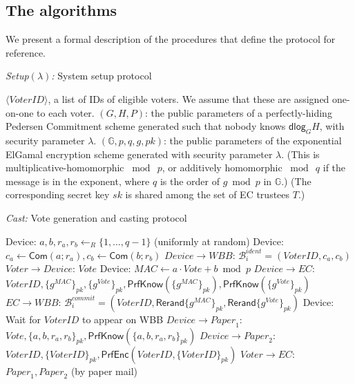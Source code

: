 \documentclass[12pt,a4paper]{article}
\newcommand{\commit}{\mathsf{Com}}
\newcommand{\PrfEnc}{\mathsf{PrfEnc}}
\newcommand{\PrfKnow}{\mathsf{PrfKnow}}
\newcommand{\rerand}{\mathsf{Rerand}}
\newcommand{\dlog}{\mathsf{dlog}}
\theoremstyle{definition}
\newcommand{\Vote}{\mathit{Vote}}
\newcommand{\VoterID}{\mathit{VoterID}}
\newcommand{\Paper}{\mathit{Paper}}
\newcommand{\Mac}{\mathit{MAC}}
\newcommand{\Wbb}{\mathit{WBB}}
\begin{document}
\subsection{The algorithms}
We present a formal description of the procedures that define the protocol for reference.
\singlespacing
\begin{algorithm}
    \caption{\textit{Setup}$(\lambda)$\textit{:} System setup protocol}
	\begin{algorithmic}[1]
\State $\langle \VoterID \rangle$, a list of IDs of eligible voters.  We assume that these are assigned one-on-one to each voter.
\State	$(G,H,P)$: the public parameters of a perfectly-hiding Pedersen Commitment scheme  generated such that nobody knows $\dlog_G H$, with security parameter $\lambda$.
\State $(\mathbb{G}, p, q, g, pk)$: the public parameters of the exponential ElGamal encryption scheme generated with security parameter $\lambda$.
(This is multiplicative-homomorphic $\bmod\ p$, or additively homomorphic $\bmod\ q$ if the message is in the exponent, where $q$ is the order of $g\bmod p$ in $\mathbb{G}$.)
\State  (The corresponding secret key  $sk$ is shared among the set of EC trustees $T$.)
\end{algorithmic}
	\label{alg:setup}
\end{algorithm}
\begin{algorithm}
    \caption{\textit{Cast:} Vote generation and casting protocol}
	\begin{algorithmic}[1]
	\State Device: $a,b,r_a,r_b\leftarrow_R\{1,\ldots,q-1\}$ (uniformly at random)
	\State Device: $c_a\leftarrow\commit(a;r_a), c_b\leftarrow\commit(b;r_b)$
	\State $Device\rightarrow \Wbb$: $\mathcal{B}^{ident}_i=(\VoterID, c_a, c_b)$\label{Step:VoterCommit}
	\State $Voter\rightarrow Device$: $\Vote$
	\State Device: $\Mac\leftarrow a\cdot Vote+b\bmod p$
	\State $Device\rightarrow EC$: $\VoterID, \{g^\Mac\}_{pk}, \{g^\Vote\}_{pk}, \PrfKnow(\{g^\Mac\}_{pk}), \PrfKnow(\{g^\Vote\}_{pk})$%
	\State $EC\rightarrow \Wbb$: $\mathcal{B}^{commit}_i=(\VoterID, \rerand\{g^\Mac\}_{pk}, \rerand\{g^\Vote\}_{pk})$ \label{Step:ECPostsVoteMAC}
	\State Device: Wait for $\VoterID$ to appear on WBB
	\State $Device\rightarrow \Paper_1$: $\Vote, \{a,b,r_a,r_b\}_{pk}, \PrfKnow(\{a,b,r_a,r_b\}_{pk})$
	\State $Device\rightarrow \Paper_2$: $\VoterID, \{\VoterID\}_{pk}, \PrfEnc(\VoterID, \{\VoterID\}_{pk})$
	\State $Voter\rightarrow EC$: $\Paper_1, \Paper_2$ (by paper mail)
	\end{algorithmic}
\label{alg:cast}
\end{algorithm}
\end{document}
